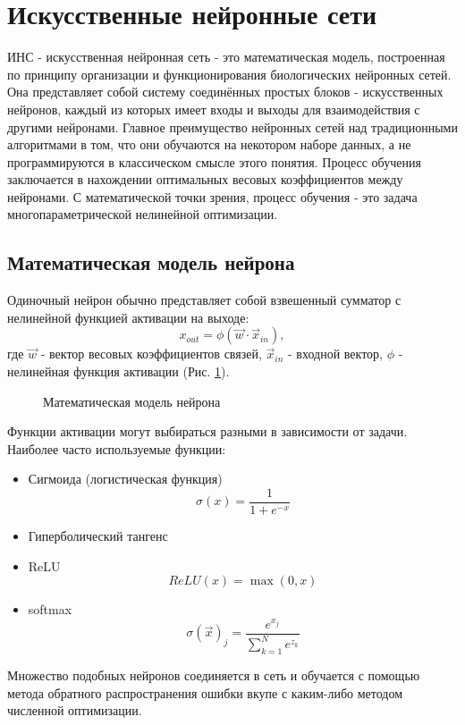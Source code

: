 \clearpage
\section{Искусственные нейронные сети}
	ИНС - искусственная нейронная сеть - это математическая модель, построенная по принципу организации и функционирования биологических нейронных сетей. Она представляет собой систему соединённых простых блоков - искусственных нейронов, каждый из которых имеет входы и выходы для взаимодействия с другими нейронами. Главное преимущество нейронных сетей над традиционными алгоритмами в том, что они обучаются на некотором наборе данных, а не программируются в классическом смысле этого понятия. Процесс обучения заключается в нахождении оптимальных весовых коэффициентов между нейронами. С математической точки зрения, процесс обучения - это задача многопараметрической нелинейной оптимизации.
	\subsection{Математическая модель нейрона}
		Одиночный нейрон обычно представляет собой взвешенный сумматор с нелинейной функцией активации на выходе:
		$$x_{out} = \phi(\vec{w} \cdotp \vec{x}_{in}),$$
		где $\vec{w}$ - вектор весовых коэффициентов связей, $\vec{x}_{in}$ - входной вектор, $\phi$ - нелинейная функция активации (Рис. \ref{3-artificial-neuron-model}).
		
		\begin{figure}[h]
			\caption{Математическая модель нейрона}
			\label{3-artificial-neuron-model}
		\end{figure}
		
		Функции активации могут выбираться разными в зависимости от задачи. Наиболее часто используемые функции:
		
		\begin{itemize}
			\item Сигмоида (логистическая функция)
					$$\sigma(x) = \frac{1}{1 + e^{-x}}$$
			\item Гиперболический тангенс
			\item ReLU
					$$ReLU(x) = \max(0, x)$$
			\item softmax
					$$\sigma(\vec{x})_j = \frac{e^{x_j}}{\sum_{k=1}^{N} e^{z_k}}$$
		\end{itemize}
		Множество подобных нейронов соединяется в сеть и обучается с помощью метода обратного распространения ошибки вкупе с каким-либо методом численной оптимизации.
